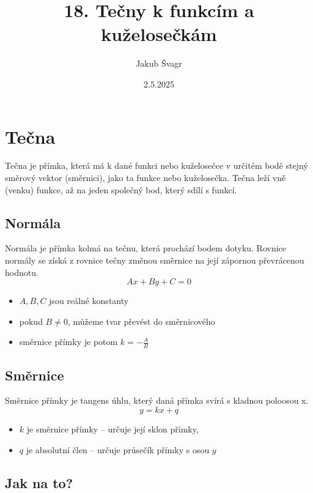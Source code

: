 \title{18. Tečny k funkcím a kuželosečkám}
\author{Jakub Švagr}
\date{2.5.2025}

\maketitle

\section{Tečna}
Tečna je přímka, která má k dané funkci nebo kuželosečce v určitém bodě stejný směrový vektor (směrnici), jako ta funkce nebo kuželosečka. Tečna leží vně (venku) funkce, až na jeden společný bod, který sdílí s funkcí.

\subsection{Normála}
Normála je přímka kolmá na tečnu, která prochází bodem dotyku. Rovnice normály se získá z rovnice tečny změnou směrnice na její zápornou převrácenou hodnotu.
\[
Ax + By + C = 0
\]

\begin{itemize}
  \item \( A, B, C \) jsou reálné konstanty
  \item pokud \( B \neq 0 \), můžeme tvar převést do směrnicového
  \item směrnice přímky je potom \( k = -\frac{A}{B} \)
\end{itemize}

\subsection{Směrnice}
Směrnice přímky je tangens úhlu, který daná přímka svírá s kladnou poloosou x.
\[
y = kx + q
\]
\begin{itemize}
  \item \( k \) je směrnice přímky – určuje její sklon přímky,
  \item \( q \) je absolutní člen – určuje průsečík přímky s osou \( y \)
\end{itemize}

\subsection{Jak na to?}

